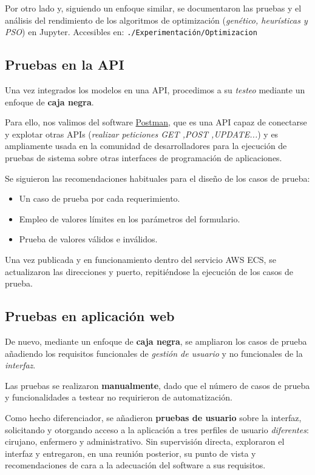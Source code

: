 Por otro lado y, siguiendo un enfoque similar, se documentaron las pruebas y el análisis del rendimiento de los algoritmos de optimización (\textit{genético, heurísticas y PSO}) en Jupyter. Accesibles en: 
\texttt{./Experimentación/Optimizacion}

\subsection{Pruebas en la API}

Una vez integrados los modelos en una API, procedimos a su \textit{testeo} mediante un enfoque de \textbf{caja negra}.

Para ello, nos valimos del software \href{https://www.postman.com/}{Postman}, que es una API capaz de conectarse y explotar otras APIs (\textit{realizar peticiones GET ,POST ,UPDATE...}) y es ampliamente usada en la comunidad de desarrolladores para la ejecución de pruebas de sistema sobre otras interfaces de programación de aplicaciones.

Se siguieron las recomendaciones habituales para el diseño de los casos de prueba:

\begin{itemize}
    \item Un caso de prueba por cada requerimiento.
    \item Empleo de valores límites en los parámetros del formulario.
    \item Prueba de valores válidos e inválidos.
\end{itemize}


Una vez publicada y en funcionamiento dentro del servicio AWS ECS, se actualizaron las direcciones y puerto, repitiéndose la ejecución de los casos de prueba.

\subsection{Pruebas en aplicación web}

De nuevo, mediante un enfoque de \textbf{caja negra}, se ampliaron los casos de prueba añadiendo los requisitos funcionales de \textit{gestión de usuario} y no funcionales de la \textit{interfaz}.

Las pruebas se realizaron \textbf{manualmente}, dado que el número de casos de prueba y funcionalidades a testear no requirieron de automatización.

Como hecho diferenciador, se añadieron \textbf{pruebas de usuario} sobre la interfaz, solicitando y otorgando acceso a la aplicación a tres perfiles de usuario \textit{diferentes}: cirujano, enfermero y administrativo.
Sin supervisión directa, exploraron el interfaz y entregaron, en una reunión posterior, su punto de vista y recomendaciones de cara a la adecuación del software a sus requisitos.

